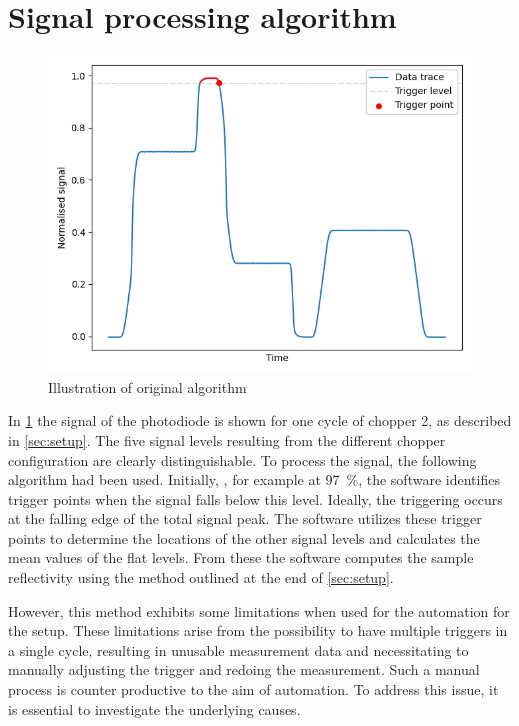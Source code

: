\section{Signal processing algorithm}\label{sec:processing}

\begin{figure}
    \vspace{-\baselineskip}
    \centering
    \includegraphics[width=.98\textwidth]{images/old_trace.png}
    \caption{Illustration of original algorithm}
    \label{fig:trace}
\end{figure}
In \cref{fig:trace} the signal of the photodiode is shown for one cycle of chopper 2, as described in \cref{sec:setup}. The five signal levels resulting from the different chopper configuration are clearly distinguishable. To process the signal, the following algorithm had been used. Initially, , for example at \qty{97}{\percent}, the software identifies trigger points when the signal falls below this level. Ideally, the triggering occurs at the falling edge of the total signal peak. The software utilizes these trigger points to determine the locations of the other signal levels and calculates the mean values of the flat levels. From these the software computes the sample reflectivity using the method outlined at the end of \cref{sec:setup}. 

However, this method exhibits some limitations when used for the automation for the setup. These limitations arise from the possibility to have multiple triggers in a single cycle, resulting in unusable measurement data and necessitating to manually adjusting the trigger and redoing the measurement. Such a manual process is counter productive to the aim of automation. To address this issue, it is essential to investigate the underlying causes.


